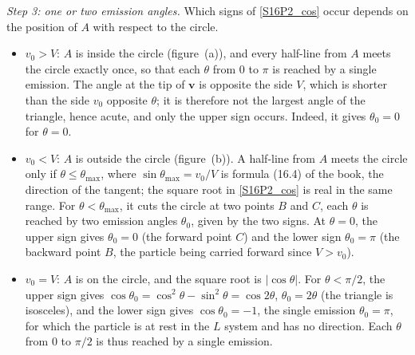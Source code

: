 \begin{problem}[title={Lab angular distribution of decay products}]
{\textit{Step 3: one or two emission angles.} Which signs of \eqref{S16P2_cos} occur depends on the position of $A$ with respect to the circle.
\begin{itemize}
    \item $v_0>V$: $A$ is inside the circle (figure~(a)), and every half-line from $A$ meets the circle exactly once, so that each $\theta$ from $0$ to $\pi$ is reached by a single emission. The angle at the tip of $\mathbf{v}$ is opposite the side $V$, which is shorter than the side $v_0$ opposite $\theta$; it is therefore not the largest angle of the triangle, hence acute, and only the upper sign occurs. Indeed, it gives $\theta_0 = 0$ for $\theta = 0$.
    \item $v_0<V$: $A$ is outside the circle (figure~(b)). A half-line from $A$ meets the circle only if $\theta \leq \theta_{\mathrm{max}}$, where $\sin{\theta_{\mathrm{max}}} = v_0/V$ is formula (16.4) of the book, the direction of the tangent; the square root in \eqref{S16P2_cos} is real in the same range. For $\theta<\theta_{\mathrm{max}}$, it cuts the circle at two points $B$ and $C$, \ie each $\theta$ is reached by two emission angles $\theta_0$, given by the two signs. At $\theta = 0$, the upper sign gives $\theta_0 = 0$ (the forward point $C$) and the lower sign $\theta_0 = \pi$ (the backward point $B$, the particle being carried forward since $V>v_0$).
    \item $v_0=V$: $A$ is on the circle, and the square root is $|\cos{\theta}|$. For $\theta<\pi/2$, the upper sign gives $\cos{\theta_0} = \cos^2{\theta}-\sin^2{\theta} = \cos{2\theta}$, \ie $\theta_0 = 2\theta$ (the triangle is isosceles), and the lower sign gives $\cos{\theta_0} = -1$, \ie the single emission $\theta_0 = \pi$, for which the particle is at rest in the $L$ system and has no direction. Each $\theta$ from $0$ to $\pi/2$ is thus reached by a single emission.
\end{itemize}

}
\end{problem}
